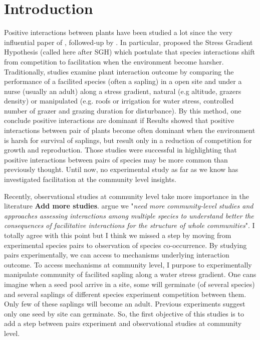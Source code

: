 \documentclass[12pt]{article} %
\begin{document}
\section{Introduction}

Positive interactions between plants have been studied a lot since the very influential paper of \citep{Bertness1994}, followed-up by \citep{Bruno2003}. In particular, \citet{Bertness1994} proposed the Stress Gradient Hypothesis (called here after SGH) which postulate that species interactions shift from competition to facilitation when the environment become harsher. Traditionally, studies examine plant interaction outcome by comparing the performance of a facilited species (often a sapling) in a open site and under a nurse (usually an adult) along a stress gradient, natural (e.g altitude, grazers density) or manipulated (e.g. roofs or irrigation for water stress, controlled number of grazer and grazing duration for disturbance). By this method, one conclude positive interactions are dominant if  Results showed that positive interactions between pair of plants become often dominant when the environment is harsh for survival of saplings, but result only in a reduction of competition for growth and reproduction\citep{He2013}. Those studies were successful in highlighting that positive interactions between pairs of species may be more common than previously thought. Until now, no experimental study as far as we know has investigated facilitation at the community level insights. 

Recently, observational studies at community level take more importance in the literature \citep{Soliveres2012, Gross2013, Soliveres2014b} \textbf{Add more studies}. \citet{Soliveres2014} argue we "\textit{need more community-level studies and approaches assessing interactions among multiple species to understand better the consequences of facilitative interactions for the structure of whole communities}". I totally agree with this point but I think we missed a step by moving from experimental species pairs to observation of species co-occurrence. By studying pairs experimentally, we can access to mechanisms underlying interaction outcome. To access mechanisms at community level, I purpose to experimentally manipulate community of facilited sapling along a water stress gradient.
One cans imagine when a seed pool arrive in a site, some will germinate (of several species) and several saplings of different species experiment competition between them. Only few of these saplings will become an adult. Previous experiments suggest only one seed by site can germinate. So, the first objective of this studies is to add a step between pairs experiment and observational studies at community level.
\end{document}
